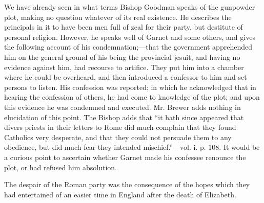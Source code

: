 We have already seen in what terms Bishop Goodman
speaks of the gunpowder plot, making no question whatever of its real
existence. He describes the principals in it to have been men full of
zeal for their party, but destitute of personal religion. However, he
speaks well of Garnet and some others, and gives the following account
of his condemnation;—that the government apprehended him on the
general ground of his being the provincial jesuit, and having no
evidence against him, had recourse to artifice. They put him into a
chamber where he could be overheard, and then introduced a confessor to
him and set persons to listen. His confession was reported; in which he
acknowledged that in hearing the confession of others, he had come to
knowledge of the plot; and upon this evidence he was condemned and
executed. Mr. Brewer adds nothing in elucidation of this point. The
Bishop adds that ``it hath since appeared that divers priests in their
letters to Rome did much complain that they found Catholics very
desperate, and that they could not persuade them to any obedience, but
did much fear they intended mischief.''—vol. i. p. 108. It would be a
curious point to ascertain whether Garnet made his confessee renounce
the plot, or had refused him absolution.

The despair of the Roman party was the consequence
of the hopes which they had entertained of an easier time in England
after the death of Elizabeth.

